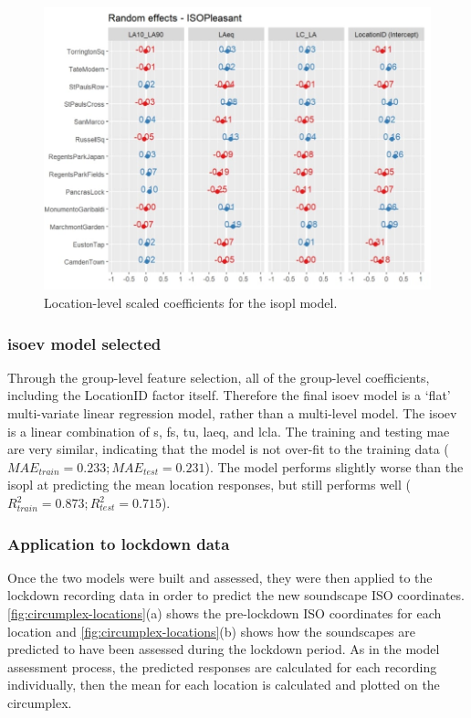   \begin{figure}[h!]
     \caption{Location-level scaled coefficients for the \gls{isopl} model. \label{fig:pl-slopes}}
     \centering
     \includegraphics[width=\textwidth]{Figures/Lockdown Figure4.jpg}
   \end{figure}

   \subsubsection{\gls{isoev} model selected}

   Through the group-level feature selection, all of the group-level coefficients, including the LocationID factor itself. Therefore the final \gls{isoev} model is a `flat' multi-variate linear regression model, rather than a multi-level model. The \gls{isoev} is a linear combination of \gls{s}, \gls{fs}, \gls{tu}, \gls{laeq}, and \gls{lcla}. The training and testing \gls{mae} are very similar, indicating that the model is not over-fit to the training data ($MAE_{train}=0.233; MAE_{test}=0.231$). The model performs slightly worse than the \gls{isopl} at predicting the mean location responses, but still performs well ($R^2_{train}=0.873; R^2_{test}=0.715$).

   \subsubsection{Application to lockdown data}
   Once the two models were built and assessed, they were then applied to the lockdown recording data in order to predict the new soundscape ISO coordinates. \cref{fig:circumplex-locations}(a) shows the pre-lockdown ISO coordinates for each location and \cref{fig:circumplex-locations}(b) shows how the soundscapes are predicted to have been assessed during the lockdown period. As in the model assessment process, the predicted responses are calculated for each recording individually, then the mean for each location is calculated and plotted on the circumplex.

